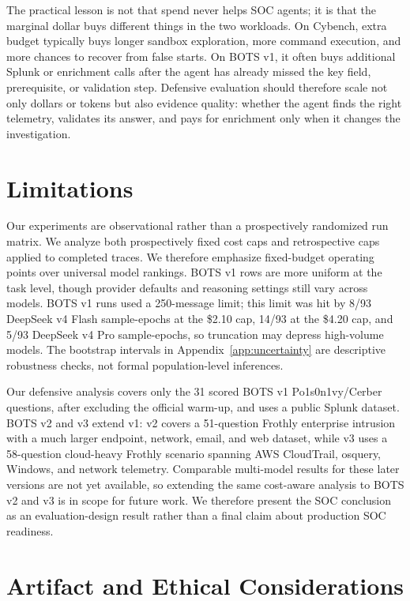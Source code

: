 \documentclass{jmlr}%
\begin{document}
The practical lesson is not that spend never helps SOC agents; it is that the marginal dollar buys different things in the two workloads.
On Cybench, extra budget typically buys longer sandbox exploration, more command execution, and more chances to recover from false starts.
On BOTS v1, it often buys additional Splunk or enrichment calls after the agent has already missed the key field, prerequisite, or validation step.
Defensive evaluation should therefore scale not only dollars or tokens but also evidence quality: whether the agent finds the right telemetry, validates its answer, and pays for enrichment only when it changes the investigation.

\section{Limitations}
\label{sec:limitations}

Our experiments are observational rather than a prospectively randomized run matrix.
We analyze both prospectively fixed cost caps and retrospective caps applied to completed traces.
We therefore emphasize fixed-budget operating points over universal model rankings.
BOTS v1 rows are more uniform at the task level, though provider defaults and reasoning settings still vary across models.
BOTS v1 runs used a 250-message limit; this limit was hit by 8/93 DeepSeek v4 Flash sample-epochs at the \$2.10 cap, 14/93 at the \$4.20 cap, and 5/93 DeepSeek v4 Pro sample-epochs, so truncation may depress high-volume models.
The bootstrap intervals in Appendix~\ref{app:uncertainty} are descriptive robustness checks, not formal population-level inferences.

Our defensive analysis covers only the 31 scored BOTS v1 Po1s0n1vy/Cerber questions, after excluding the official warm-up, and uses a public Splunk dataset.
BOTS v2 and v3 extend v1: v2 covers a 51-question Frothly enterprise intrusion with a much larger endpoint, network, email, and web dataset, while v3 uses a 58-question cloud-heavy Frothly scenario spanning AWS CloudTrail, osquery, Windows, and network telemetry.
Comparable multi-model results for these later versions are not yet available, so extending the same cost-aware analysis to BOTS v2 and v3 is in scope for future work.
We therefore present the SOC conclusion as an evaluation-design result rather than a final claim about production SOC readiness.

\section{Artifact and Ethical Considerations}
\label{sec:ethics}
\end{document}
